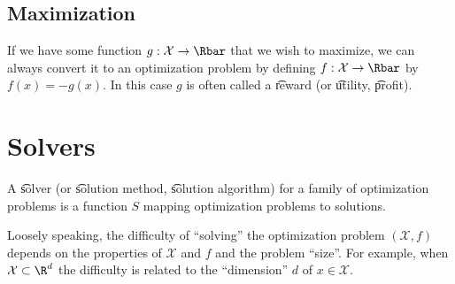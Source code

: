 \subsection*{Maximization}

If we have some function $g: \mathcal{X}  \to \Rbar$ that we wish to maximize, we can always convert it to an optimization problem by defining $f: \mathcal{X}  \to \Rbar$ by $f(x) = -g(x)$.
In this case $g$ is often called a \t{reward} (or \t{utility}, \t{profit}).

\section*{Solvers}

A \t{solver} (or \t{solution method}, \t{solution algorithm}) for a family of optimization problems is a function $S$ mapping optimization problems to solutions.

Loosely speaking, the difficulty of ``solving'' the optimization problem $(\mathcal{X} , f)$ depends on the properties of $\mathcal{X} $ and $f$ and the problem ``size''.
For example, when $\mathcal{X}  \subset \R ^d$ the difficulty is related to the ``dimension'' $d$ of $x \in \mathcal{X} $.

